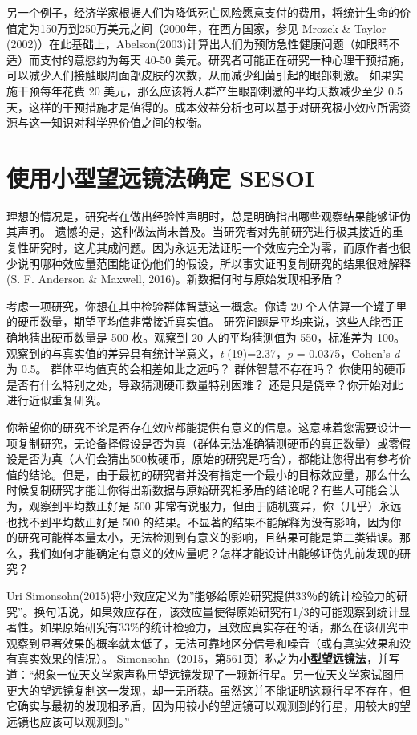 \documentclass[
  letterpaper,
  DIV=11,
  numbers=noendperiod]{scrreprt}
\begin{document}
另一个例子，经济学家根据人们为降低死亡风险愿意支付的费用，将统计生命的价值定为150万到250万美元之间（2000年，在西方国家，参见
Mrozek \& Taylor
(2002)）在此基础上，Abelson(2003)计算出人们为预防急性健康问题（如眼睛不适）而支付的意愿约为每天
40-50
美元。研究者可能正在研究一种心理干预措施，可以减少人们接触眼周面部皮肤的次数，从而减少细菌引起的眼部刺激。
如果实施干预每年花费 20
美元，那么应该将人群产生眼部刺激的平均天数减少至少 0.5
天，这样的干预措施才是值得的。成本效益分析也可以基于对研究极小效应所需资源与这一知识对科学界价值之间的权衡。

\hypertarget{ux4f7fux7528ux5c0fux578bux671bux8fdcux955cux6cd5ux786eux5b9a-sesoi}{%
\section{使用小型望远镜法确定
SESOI}\label{ux4f7fux7528ux5c0fux578bux671bux8fdcux955cux6cd5ux786eux5b9a-sesoi}}

理想的情况是，研究者在做出经验性声明时，总是明确指出哪些观察结果能够证伪其声明。
遗憾的是，这种做法尚未普及。当研究者对先前研究进行极其接近的重复性研究时，这尤其成问题。因为永远无法证明一个效应完全为零，而原作者也很少说明哪种效应量范围能证伪他们的假设，所以事实证明复制研究的结果很难解释(S.
F. Anderson \& Maxwell, 2016)。新数据何时与原始发现相矛盾？

考虑一项研究，你想在其中检验群体智慧这一概念。你请 20
个人估算一个罐子里的硬币数量，期望平均值非常接近真实值。
研究问题是平均来说，这些人能否正确地猜出硬币数量是 500 枚。观察到 20
人的平均猜测值为 550，标准差为
100。观察到的与真实值的差异具有统计学意义，\emph{t} (19)=2.37，\emph{p}
= 0.0375，Cohen's \emph{d} 为 0.5。 群体平均值真的会相差如此之远吗？
群体智慧不存在吗？
你使用的硬币是否有什么特别之处，导致猜测硬币数量特别困难？
还是只是侥幸？你开始对此进行近似重复研究。

你希望你的研究不论是否存在效应都能提供有意义的信息。这意味着您需要设计一项复制研究，无论备择假设是否为真（群体无法准确猜测硬币的真正数量）或零假设是否为真（人们会猜出500枚硬币，原始的研究是巧合），都能让您得出有参考价值的结论。但是，由于最初的研究者并没有指定一个最小的目标效应量，那么什么时候复制研究才能让你得出新数据与原始研究相矛盾的结论呢？有些人可能会认为，观察到平均数正好是
500 非常有说服力，但由于随机变异，你（几乎）永远也找不到平均数正好是 500
的结果。不显著的结果不能解释为没有影响，因为你的研究可能样本量太小，无法检测到有意义的影响，且结果可能是第二类错误。那么，我们如何才能确定有意义的效应量呢？怎样才能设计出能够证伪先前发现的研究？

Uri
Simonsohn(2015)将小效应定义为''能够给原始研究提供33％的统计检验力的研究''。换句话说，如果效应存在，该效应量使得原始研究有1/3的可能观察到统计显著性。如果原始研究有33\%的统计检验力，且效应真实存在的话，那么在该研究中观察到显著效果的概率就太低了，无法可靠地区分信号和噪音（或有真实效果和没有真实效果的情况）。
Simonsohn（2015，第561页）称之为\textbf{小型望远镜法}，并写道：``想象一位天文学家声称用望远镜发现了一颗新行星。另一位天文学家试图用更大的望远镜复制这一发现，却一无所获。虽然这并不能证明这颗行星不存在，但它确实与最初的发现相矛盾，因为用较小的望远镜可以观测到的行星，用较大的望远镜也应该可以观测到。''
\end{document}
